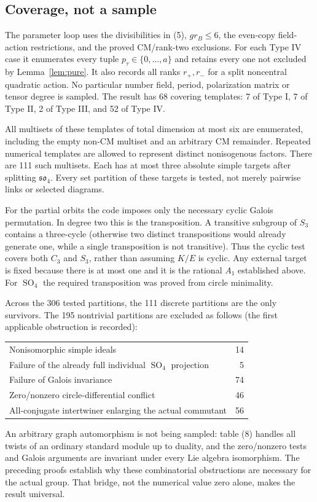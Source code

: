 \documentclass[11pt]{article}
\DeclareMathOperator{\SO}{SO}
\theoremstyle{remark}
\begin{document}
\subsection{Coverage, not a sample}

The parameter loop uses the divisibilities in (5), $gr_B\leq6$,
the even-copy field-action restrictions, and the proved CM/rank-two
exclusions. For each Type IV case it enumerates every tuple
$p_\tau\in\{0,\ldots,a\}$ and retains every one not excluded by
Lemma~\ref{lem:pure}. It also records all ranks $r_+,r_-$ for a
split noncentral quadratic action. No particular number field,
period, polarization matrix or tensor degree is sampled.
The result has 68 covering templates: 7 of Type I, 7 of Type II,
2 of Type III, and 52 of Type IV.

All multisets of these templates of total dimension at most six
are enumerated, including the empty non-CM multiset and an arbitrary
CM remainder. Repeated numerical templates are allowed to represent
distinct nonisogenous factors. There are 111 such multisets.
Each has at most three absolute simple targets after splitting
$\mathfrak{so}_4$. Every set partition of these targets is tested,
not merely pairwise links or selected diagrams.

For the partial orbits the code imposes only the necessary cyclic
Galois permutation. In degree two this is the transposition. A
transitive subgroup of $S_3$ contains a three-cycle (otherwise two
distinct transpositions would already generate one, while a single
transposition is not transitive). Thus the cyclic test covers both
$C_3$ and $S_3$, rather than assuming $K/E$ is cyclic. Any external
target is fixed because there is at most one and it is the rational
$A_1$ established above. For $\SO_4$ the required transposition
was proved from circle minimality.

Across the 306 tested partitions, the 111 discrete partitions are
the only survivors. The 195 nontrivial partitions are excluded as
follows (the first applicable obstruction is recorded):
\begin{center}
\begin{tabular}{lr}
Nonisomorphic simple ideals &14\\
Failure of the already full individual $\SO_4$ projection &5\\
Failure of Galois invariance &74\\
Zero/nonzero circle-differential conflict &46\\
All-conjugate intertwiner enlarging the actual commutant &56
\end{tabular}
\end{center}
An arbitrary graph automorphism is not being sampled: table (8)
handles all twists of an ordinary standard module up to duality,
and the zero/nonzero tests and Galois arguments are invariant under
every Lie algebra isomorphism. The preceding proofs establish why
these combinatorial obstructions are necessary for the actual group.
That bridge, not the numerical value zero alone, makes the result
universal.
\end{document}
